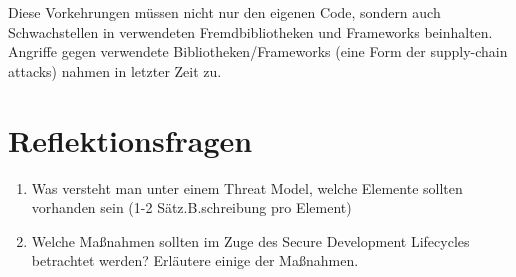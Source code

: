 Diese Vorkehrungen müssen nicht nur den eigenen Code, sondern auch Schwachstellen in verwendeten Fremdbibliotheken und Frameworks beinhalten. Angriffe gegen verwendete Bibliotheken/Frameworks (eine Form der supply-chain attacks) nahmen in letzter Zeit zu.

\section{Reflektionsfragen}

\begin{enumerate}
	\item Was versteht man unter einem Threat Model, welche Elemente sollten vorhanden sein (1-2 Sätz.B.schreibung pro Element)
	\item Welche Maßnahmen sollten im Zuge des Secure Development Lifecycles betrachtet werden? Erläutere einige der Maßnahmen.
\end{enumerate}

